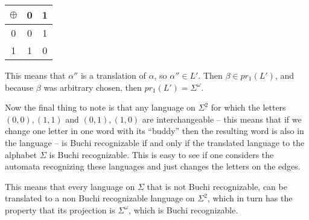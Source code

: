 \documentclass[a4paper]{article}
\begin{document}
\begin{tabular}{|c||c|c|}
  \hline
  $ \oplus $ & 0 & 1 \\
  \hline \hline
  0 & 0 & 1 \\ \hline
  1 & 1 & 0 \\ \hline
\end{tabular}

This means that $ \alpha'' $ is a translation of $ \alpha $, so $ \alpha'' \in
L' $. Then $ \beta \in pr_1(L') $, and because $ \beta $ was arbitrary chosen,
then $ pr_1(L') = \Sigma^\omega $.

Now the final thing to note is that any language on $ \Sigma^2 $ for which the
letters $ (0, 0), (1, 1) $ and $ (0, 1), (1, 0) $ are interchangeable -- this
means that if we change one letter in one word with its ``buddy'' then the
resulting word is also in the language -- is Buchi recognizable if and only if
the translated language to the alphabet $ \Sigma $ is Buchi recognizable. This
is easy to see if one considers the automata recognizing these languages and
just changes the letters on the edges.

This means that every language on $ \Sigma $ that is not Buchi recognizable,
can be translated to a non Buchi recognizable language on $ \Sigma^2 $, which
in turn has the property that its projection is $ \Sigma^\omega $, which is
Buchi recognizable.
\end{document}
